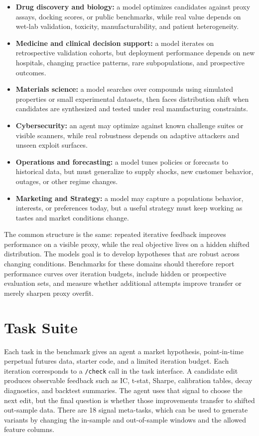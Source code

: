 \documentclass[
]{article}
\providecommand{\tightlist}{%
  \setlength{\itemsep}{0pt}\setlength{\parskip}{0pt}}
\begin{document}
\begin{itemize}
\tightlist
\item
  \textbf{Drug discovery and biology:} a model optimizes candidates against proxy assays, docking scores, or public benchmarks, while real value depends on wet-lab validation, toxicity, manufacturability, and patient heterogeneity.
\item
  \textbf{Medicine and clinical decision support:} a model iterates on retrospective validation cohorts, but deployment performance depends on new hospitals, changing practice patterns, rare subpopulations, and prospective outcomes.
\item
  \textbf{Materials science:} a model searches over compounds using simulated properties or small experimental datasets, then faces distribution shift when candidates are synthesized and tested under real manufacturing constraints.
\item
  \textbf{Cybersecurity:} an agent may optimize against known challenge suites or visible scanners, while real robustness depends on adaptive attackers and unseen exploit surfaces.
\item
  \textbf{Operations and forecasting:} a model tunes policies or forecasts to historical data, but must generalize to supply shocks, new customer behavior, outages, or other regime changes.
\item
  \textbf{Marketing and Strategy:} a model may capture a population\textquotesingle s behavior, interests, or preferences today, but a useful strategy must keep working as tastes and market conditions change.
\end{itemize}

The common structure is the same: repeated iterative feedback improves performance on a visible proxy, while the real objective lives on a hidden shifted distribution. The model\textquotesingle s goal is to develop hypotheses that are robust across changing conditions. Benchmarks for these domains should therefore report performance curves over iteration budgets, include hidden or prospective evaluation sets, and measure whether additional attempts improve transfer or merely sharpen proxy overfit.

\section{Task Suite}\label{task-suite}

Each task in the benchmark gives an agent a market hypothesis, point-in-time perpetual futures data, starter code, and a limited iteration budget. Each iteration corresponds to a \texttt{/check} call in the task interface. A candidate edit produces observable feedback such as IC, t-stat, Sharpe, calibration tables, decay diagnostics, and backtest summaries. The agent uses that signal to choose the next edit, but the final question is whether those improvements transfer to shifted out-sample data. There are 18 signal meta-tasks, which can be used to generate variants by changing the in-sample and out-of-sample windows and the allowed feature columns.
\end{document}
